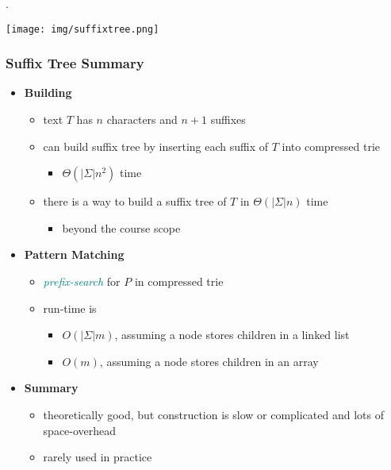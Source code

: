 \documentclass{article}
\begin{document}
\begin{examplee}[].
    \begin{center}
        \texttt{[image: img/suffixtree.png]}
    \end{center}
\end{examplee}

\subsubsection{Suffix Tree Summary} 

\begin{itemize}
    \item \textbf{Building}
    \begin{itemize}
        \item text $T$ has $n$ characters and $n + 1$ suffixes
        \item can build suffix tree by inserting each suffix of $T$ into compressed trie
        \begin{itemize}
            \item $\Theta(|\Sigma| n^2)$ time
        \end{itemize}
        \item there is a way to build a suffix tree of $T$ in $\Theta(|\Sigma| n)$ time
        \begin{itemize}
            \item beyond the course scope
        \end{itemize}
    \end{itemize}

    \item \textbf{Pattern Matching}
    \begin{itemize}
        \item \textcolor{teal}{\textit{prefix-search}} for $P$ in compressed trie
        \item run-time is
        \begin{itemize}
            \item $O(|\Sigma| m)$, assuming a node stores children in a linked list
            \item $O(m)$, assuming a node stores children in an array
        \end{itemize}
    \end{itemize}

    \item \textbf{Summary}
    \begin{itemize}
        \item theoretically good, but construction is slow or complicated and lots of space-overhead
        \item rarely used in practice
    \end{itemize}
\end{itemize}
\end{document}
